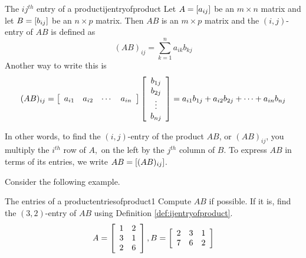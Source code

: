 \begin{definition}{The $ij^{th}$ entry of a product}{ijentryofproduct}
Let $A=\left[ a_{ij}\right] $ be an $m\times n$ matrix and
let $B=\left[ b_{ij}\right] $ be an $n\times p$ matrix. Then $AB$ is an 
$m\times p$ matrix and the $\left( i, j \right)$-entry of $AB$ is defined as 
\begin{equation*}
(AB)_{ij}=\sum_{k=1}^{n}a_{ik}b_{kj}  
\end{equation*}
Another way to write this is
\begin{equation*}
(AB)_{ij}=\left[
\begin{array}{cccc}
a_{i1} & a_{i2} & \cdots & a_{in}
\end{array}
\right] \left[
\begin{array}{c}
b_{1j} \\
b_{2j} \\
\vdots \\
b_{nj}
\end{array}
\right]
= 
a_{i1}b_{1j} + a_{i2}b_{2j} + \cdots + a_{in}b_{nj}
\end{equation*}
\end{definition}

In other words, to find the $\left( i, j \right)$-entry of the product $AB$, or $(AB)_{ij}$,
you multiply the $i^{th}$ row of 
$A,$ on the left by the $j^{th}$ column of $B$. To express $AB$ in terms of its entries, we write $AB = \left[ (AB)_{ij} \right]$.

Consider the following example. 

\begin{example}{The entries of a product}{entriesofproduct1}
Compute $AB$ if possible. If it is, find the $\left( 3,2 \right)$-entry of $AB$ using Definition \ref{def:ijentryofproduct}. 
\begin{equation*}
A = \left[
\begin{array}{cc}
1 & 2 \\
3 & 1 \\
2 & 6
\end{array}
\right], B = \left[
\begin{array}{ccc}
2 & 3 & 1 \\
7 & 6 & 2
\end{array}
\right]
\end{equation*}
\end{example}

